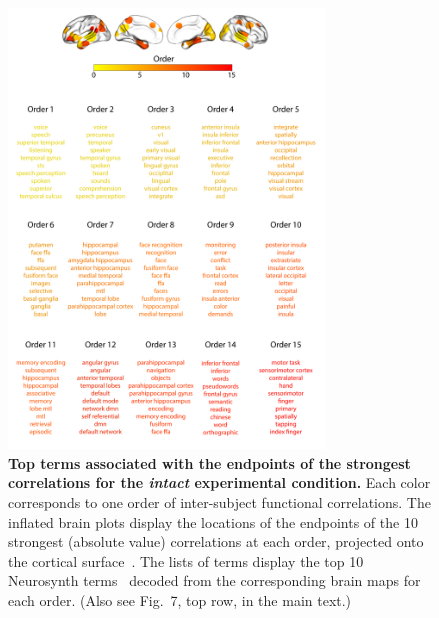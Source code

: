 \documentclass{article}
\newcommand{\neurosynth}{7}
\begin{document}
\begin{figure}[p!]
\centering
\includegraphics[width=0.75\textwidth]{figs/supp_15_intact}
\caption{\textbf{Top terms associated with the endpoints of the
    strongest correlations for the \textit{intact} experimental
    condition.}  Each color corresponds to one order of inter-subject
functional correlations. The inflated brain plots display the
locations of the endpoints of the 10 strongest (absolute value)
correlations at each order, projected onto the cortical
surface~\citep{CombEtal19}.  The lists of terms display
the top 10 Neurosynth terms~\citep{RubiEtal17} decoded from the
corresponding brain maps for each order.  (Also see Fig.~\neurosynth,
top row, in the main text.)}
\label{fig:intact}
\end{figure}
\end{document}
